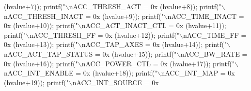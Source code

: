 \begin{DoxyCode}
{{{{{{{{      (hvalue+7));
  printf(\textcolor{stringliteral}{"\(\backslash\)nACC\_THRESH\_ACT = 0x%
      (hvalue+8));
  printf(\textcolor{stringliteral}{"\(\backslash\)nACC\_THRESH\_INACT = 0x%
      (hvalue+9));
  printf(\textcolor{stringliteral}{"\(\backslash\)nACC\_TIME\_INACT = 0x%
      (hvalue+10));
  printf(\textcolor{stringliteral}{"\(\backslash\)nACC\_ACT\_INACT\_CTL = 0x%
      (hvalue+11));
  printf(\textcolor{stringliteral}{"\(\backslash\)nACC\_THRESH\_FF = 0x%
      (hvalue+12));
  printf(\textcolor{stringliteral}{"\(\backslash\)nACC\_TIME\_FF = 0x%
      (hvalue+13));
  printf(\textcolor{stringliteral}{"\(\backslash\)nACC\_TAP\_AXES = 0x%
      (hvalue+14));
  printf(\textcolor{stringliteral}{"\(\backslash\)nACC\_ACT\_TAP\_STATUS = 0x%
      (hvalue+15));
  printf(\textcolor{stringliteral}{"\(\backslash\)nACC\_BW\_RATE = 0x%
      (hvalue+16));
  printf(\textcolor{stringliteral}{"\(\backslash\)nACC\_POWER\_CTL = 0x%
      (hvalue+17));
  printf(\textcolor{stringliteral}{"\(\backslash\)nACC\_INT\_ENABLE = 0x%
      (hvalue+18));
  printf(\textcolor{stringliteral}{"\(\backslash\)nACC\_INT\_MAP = 0x%
      (hvalue+19));
  printf(\textcolor{stringliteral}{"\(\backslash\)nACC\_INT\_SOURCE = 0x%
}}}}}}}}}}}}}}}}}}}}}
\end{DoxyCode}
